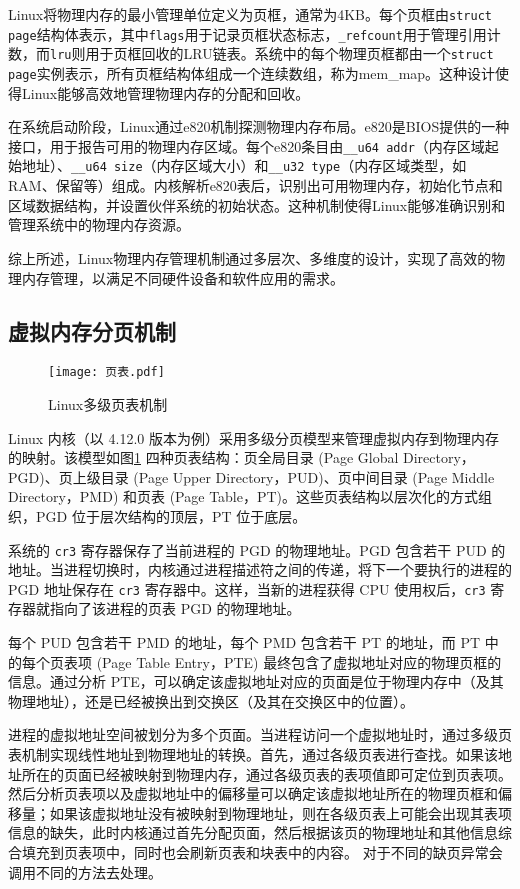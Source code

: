 Linux将物理内存的最小管理单位定义为页框，通常为4KB。每个页框由\texttt{struct page}结构体表示，其中\texttt{flags}用于记录页框状态标志，\texttt{\_refcount}用于管理引用计数，而\texttt{lru}则用于页框回收的LRU链表。系统中的每个物理页框都由一个\texttt{struct page}实例表示，所有页框结构体组成一个连续数组，称为mem\_map。这种设计使得Linux能够高效地管理物理内存的分配和回收。

在系统启动阶段，Linux通过e820机制探测物理内存布局。e820是BIOS提供的一种接口，用于报告可用的物理内存区域。每个e820条目由\texttt{\_\_u64 addr}（内存区域起始地址）、\texttt{\_\_u64 size}（内存区域大小）和\texttt{\_\_u32 type}（内存区域类型，如RAM、保留等）组成。内核解析e820表后，识别出可用物理内存，初始化节点和区域数据结构，并设置伙伴系统的初始状态。这种机制使得Linux能够准确识别和管理系统中的物理内存资源。

综上所述，Linux物理内存管理机制通过多层次、多维度的设计，实现了高效的物理内存管理，以满足不同硬件设备和软件应用的需求。

\subsection{虚拟内存分页机制}

\begin{figure}[h]
    \centering
    \texttt{[image: 页表.pdf]}
    \caption{Linux多级页表机制}
    \label{页表}
\end{figure}

Linux 内核（以 4.12.0 版本为例）采用多级分页模型来管理虚拟内存到物理内存的映射。该模型如图\ref{页表} 四种页表结构：页全局目录 (Page Global Directory，PGD)、页上级目录 (Page Upper Directory，PUD)、页中间目录 (Page Middle Directory，PMD) 和页表 (Page Table，PT)。这些页表结构以层次化的方式组织，PGD 位于层次结构的顶层，PT 位于底层。

系统的 \texttt{cr3} 寄存器保存了当前进程的 PGD 的物理地址。PGD 包含若干 PUD 的地址。当进程切换时，内核通过进程描述符之间的传递，将下一个要执行的进程的 PGD 地址保存在 \texttt{cr3} 寄存器中。这样，当新的进程获得 CPU 使用权后，\texttt{cr3} 寄存器就指向了该进程的页表 PGD 的物理地址。

每个 PUD 包含若干 PMD 的地址，每个 PMD 包含若干 PT 的地址，而 PT 中的每个页表项 (Page Table Entry，PTE) 最终包含了虚拟地址对应的物理页框的信息。通过分析 PTE，可以确定该虚拟地址对应的页面是位于物理内存中（及其物理地址），还是已经被换出到交换区（及其在交换区中的位置）。

进程的虚拟地址空间被划分为多个页面。当进程访问一个虚拟地址时，通过多级页表机制实现线性地址到物理地址的转换。首先，通过各级页表进行查找。如果该地址所在的页面已经被映射到物理内存，通过各级页表的表项值即可定位到页表项。然后分析页表项以及虚拟地址中的偏移量可以确定该虚拟地址所在的物理页框和偏移量；如果该虚拟地址没有被映射到物理地址，则在各级页表上可能会出现其表项信息的缺失，此时内核通过首先分配页面，然后根据该页的物理地址和其他信息综合填充到页表项中，同时也会刷新页表和块表中的内容。 对于不同的缺页异常会调用不同的方法去处理。

